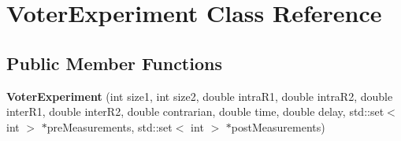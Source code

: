 \hypertarget{class_voter_experiment}{}\section{Voter\+Experiment Class Reference}
\label{class_voter_experiment}
\subsection*{Public Member Functions}
\begin{DoxyCompactItemize}
\item 
\hypertarget{class_voter_experiment_a1d1c7a26444c8cd21c571354fe624596}{}{\bfseries Voter\+Experiment} (int size1, int size2, double intra\+R1, double intra\+R2, double inter\+R1, double inter\+R2, double contrarian, double time, double delay, std\+::set$<$ int $>$ $\ast$pre\+Measurements, std\+::set$<$ int $>$ $\ast$post\+Measurements)\label{class_voter_experiment_a1d1c7a26444c8cd21c571354fe624596}

\end{DoxyCompactItemize}
